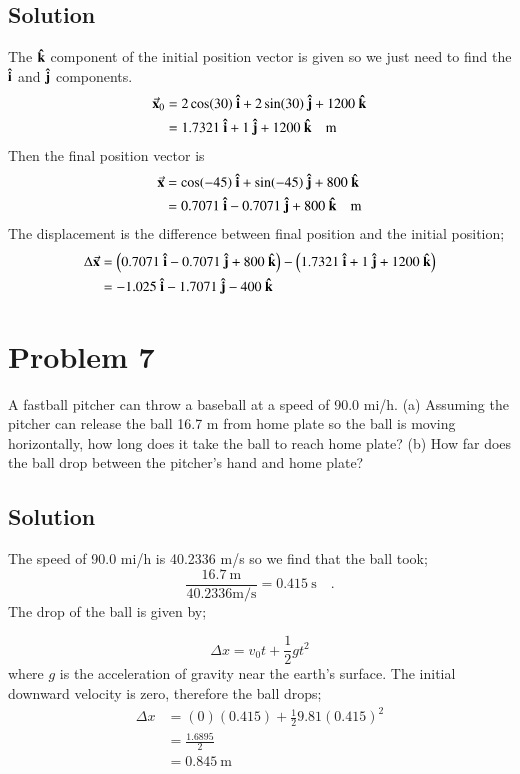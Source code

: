 \documentclass{article}
\begin{document}
\subsection*{Solution}
The $\vu k$ component of the initial position vector is given so we just need to find the $\vu i$ and $\vu j$ components.
\begin{align*}
	\va x_0 &= 2\cos(30)\ \vu i + 2\sin(30)\ \vu j + 1200\ \vu k \\
		&= 1.7321\ \vu i + 1\ \vu j + 1200\ \vu k \quad \text{m}
\end{align*}
Then the final position vector is
\begin{align*}
	\va x &= \cos(-45)\ \vu i + \sin(-45)\ \vu j + 800\ \vu k \\
	      &= 0.7071\ \vu i -0.7071\ \vu j + 800\ \vu k \quad \text{m}
\end{align*}
The displacement is the difference between final position and the initial position;
\begin{align*}
	\Delta \va x &= \left(0.7071\ \vu i -0.7071\ \vu j + 800\ \vu k \right) - \left( 1.7321\ \vu i + 1\ \vu j + 1200\ \vu k \right) \\
		     &= -1.025\ \vu  i - 1.7071\ \vu j -400\ \vu k
\end{align*}

\section*{Problem 7}
A fastball pitcher can throw a baseball at a speed of 90.0 mi/h.
(a) Assuming the pitcher can release the ball 16.7 m from home plate so the ball is moving horizontally, how long does it take
the ball to reach home plate?
(b) How far does the ball drop between the pitcher’s hand and home plate?

\subsection*{Solution}
The speed of 90.0 mi/h is 40.2336 m/s so we find that the ball took;
\[
	\frac{16.7\ \text{m}}{40.2336 \text{m/s}} = 0.415\ \text{s} \quad .
\]
The drop of the ball is given by;

\begin{equation}
	\Delta x =  v_0 t + \frac{1}{2}gt^2
\end{equation}
where $g$ is the acceleration of gravity near the earth's surface. The initial downward velocity is zero, therefore the ball drops;
\begin{align*}
	\Delta x &= (0)(0.415) + \frac{1}{2}9.81(0.415)^2 \\
		 &= \frac{1.6895}{2} \\
		 &= 0.845\ \text{m}
\end{align*}
\end{document}
